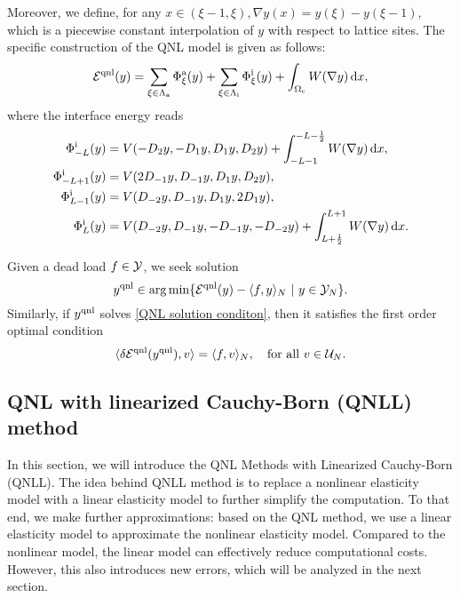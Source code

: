 	
	
	Moreover, we define, for any $x\in (\xi-1,\xi), \nabla y(x) = y(\xi)-y(\xi-1)$, which is a piecewise constant interpolation of $y$ with respect to lattice sites. The specific construction of the QNL model is given as follows:
	\begin{equation}\label{QNL energy}
		\mathcal{E}^{{\rm qnl}} (y)=\sum_{\xi \in \Lambda_{\rm a}}\Phi^{{\rm a}}_{\xi}(y) + \sum_{\xi \in \Lambda_{\rm i}}\Phi^{{\rm i}}_{\xi}(y) + \int_{\Omega_{{\rm c}}} W(\nabla y)\,\text{d} x,
	\end{equation}
	where the interface energy reads
	\begin{align*}
		\Phi^{{\rm i}}_{-L}(y)&=V(-D_{2}y,-D_{1}y,D_{1}y,D_{2}y)+\int_{-L-1}^{-L-\frac{1}{2}}W(\nabla y)\,\text{d} x,\\
		\Phi^{{\rm i}}_{-L+1}(y)&=V(2D_{-1}y,D_{-1}y,D_{1}y,D_{2}y),\\
		\Phi^{{\rm i}}_{L-1}(y)&=V(D_{-2}y,D_{-1}y,D_{1}y,2D_{1}y),\\
		\Phi^{{\rm i}}_{L}(y)&=V(D_{-2}y,D_{-1}y,-D_{-1}y,-D_{-2}y)+\int_{L+\frac{1}{2}}^{L+1}W(\nabla y)\,\text{d} x.
	\end{align*}
	
	Given a dead load $f\in \mathcal{Y}$, we seek solution
	\begin{equation}\label{QNL solution conditon}
		y^{{\rm qnl}} \in \arg \min \{\mathcal{E}^{{\rm qnl}} (y) - \langle f,y\rangle_{N} \ | \ y \in \mathcal{Y}_{N}\}.
	\end{equation}
	Similarly, if $y^{{\rm qnl}}$ solves \eqref{QNL solution conditon}, then it satisfies the first order optimal condition
	\begin{equation}\label{QNL solution first order optimality condition}
		\langle \delta \mathcal{E}^{{\rm qnl}}(y^{{\rm qnl}} ),v \rangle = \langle f,v\rangle_{N}, \quad \text{for all }v \in \mathcal{U}_{N}.
	\end{equation}
	
	\subsection{QNL with linearized Cauchy-Born (QNLL) method}
	\label{sec: introduction_qnll}
	
	In this section, we will introduce the QNL Methods with Linearized Cauchy-Born (QNLL). The idea behind QNLL method is to replace a nonlinear elasticity model with a linear elasticity model to further simplify the computation. To that end, we make further approximations: based on the QNL method, we use a linear elasticity model to approximate the nonlinear elasticity model. Compared to the nonlinear model, the linear model can effectively reduce computational costs. However, this also introduces new errors, which will be analyzed in the next section.
	

